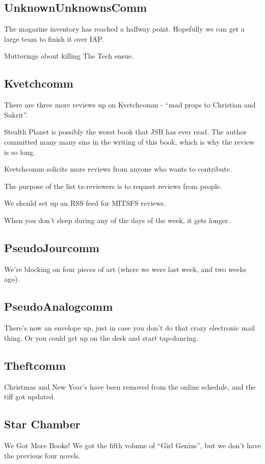\documentclass[10pt]{article}
\begin{document}
\subsection*{UnknownUnknownsComm}
The magazine inventory has reached a halfway point. Hopefully we can get a large team to finish it over IAP.

Mutterings about killing The Tech ensue.

\subsection*{Kvetchcomm}
There are three more reviews up on Kvetchcomm - ``mad props to Christian and Sukrit''.

Stealth Planet is possibly the worst book that JSB has ever read. The author committed many many sins in the writing of this book, which is why the review is so long.

Kvetchcomm solicits more reviews from anyone who wants to contribute.

The purpose of the list tz-reviewers is to request reviews from people.

We should set up an RSS feed for MITSFS reviews.

When you don't sleep during any of the days of the week, it gets longer.

\subsection*{PseudoJourcomm}
We're blocking on four pieces of art (where we were last week, and two weeks ago). 

\subsection*{PseudoAnalogcomm}
There's now an envelope up, just in case you don't do that crazy electronic mail thing. Or you could get up on the desk and start tap-dancing.

\subsection*{Theftcomm}
Christmas and New Year's have been removed from the online schedule, and the tiff got updated.

\subsection*{Star Chamber}
We Got More Books! We got the fifth volume of ``Girl Genius'', but we don't have the previous four novels.
\end{document}
